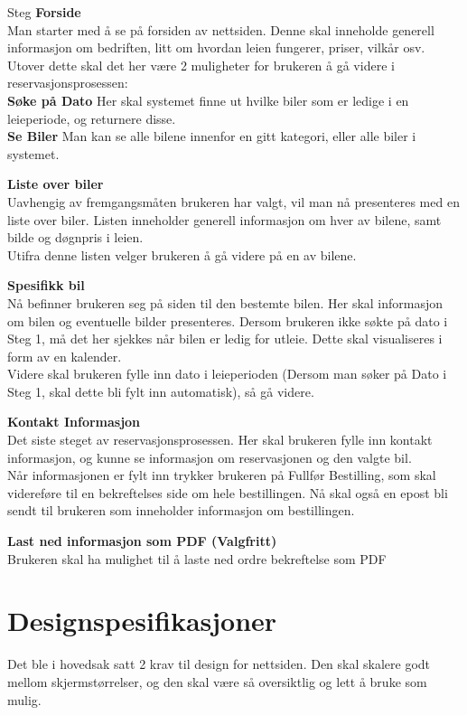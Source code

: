 \begin{steps}{Steg}
\step \textbf{Forside}\\Man starter med å se på forsiden av nettsiden. Denne skal inneholde generell informasjon om bedriften, litt om hvordan leien fungerer, priser, vilkår osv. Utover dette skal det her være 2 muligheter for brukeren å gå videre i reservasjonsprosessen:\\
\textbf{Søke på Dato} Her skal systemet finne ut hvilke biler som er ledige i en leieperiode, og returnere disse. \\
\textbf{Se Biler} Man kan se alle bilene innenfor en gitt kategori, eller alle biler i systemet.

\step \textbf{Liste over biler}\\Uavhengig av fremgangsmåten brukeren har valgt, vil man nå presenteres med en liste over biler. Listen inneholder generell informasjon om hver av bilene, samt bilde og døgnpris i leien.\\
Utifra denne listen velger brukeren å gå videre på en av bilene.

\step \textbf{Spesifikk bil}\\Nå befinner brukeren seg på siden til den bestemte bilen. Her skal informasjon om bilen og eventuelle bilder presenteres.
Dersom brukeren ikke søkte på dato i Steg 1, må det her sjekkes når bilen er ledig for utleie. Dette skal visualiseres i form av en kalender.\\
Videre skal brukeren fylle inn dato i leieperioden (Dersom man søker på Dato i Steg 1, skal dette bli fylt inn automatisk), så gå videre.

\step \textbf{Kontakt Informasjon}\\Det siste steget av reservasjonsprosessen. Her skal brukeren fylle inn kontakt informasjon, og kunne se informasjon om reservasjonen og den valgte bil.\\
Når informasjonen er fylt inn trykker brukeren på Fullfør Bestilling, som skal videreføre til en bekreftelses side om hele bestillingen. Nå skal også en epost bli sendt til brukeren som inneholder informasjon om bestillingen.

\step \textbf{Last ned informasjon som PDF (Valgfritt)}\\Brukeren skal ha mulighet til å laste ned ordre bekreftelse som PDF 

\end{steps}




\section{Designspesifikasjoner}
Det ble i hovedsak satt 2 krav til design for nettsiden. Den skal skalere godt mellom skjermstørrelser, og den skal være så oversiktlig og lett å bruke som mulig.

